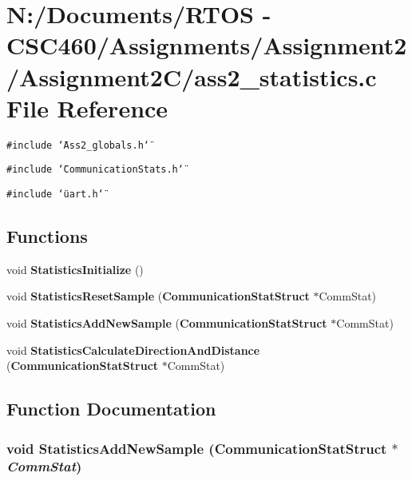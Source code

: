 \section{N:/Documents/RTOS - CSC460/Assignments/Assignment2/Assignment2C/ass2\_\-statistics.c File Reference}
\label{ass2__statistics_8c}
{\tt \#include \char`\"{}Ass2\_\-globals.h\char`\"{}}\par
{\tt \#include \char`\"{}Communication\-Stats.h\char`\"{}}\par
{\tt \#include \char`\"{}uart.h\char`\"{}}\par
\subsection*{Functions}
\begin{CompactItemize}
\item 
void {\bf Statistics\-Initialize} ()
\item 
void {\bf Statistics\-Reset\-Sample} ({\bf Communication\-Stat\-Struct} $\ast$Comm\-Stat)
\item 
void {\bf Statistics\-Add\-New\-Sample} ({\bf Communication\-Stat\-Struct} $\ast$Comm\-Stat)
\item 
void {\bf Statistics\-Calculate\-Direction\-And\-Distance} ({\bf Communication\-Stat\-Struct} $\ast$Comm\-Stat)
\end{CompactItemize}


\subsection{Function Documentation}
\subsubsection{\setlength{\rightskip}{0pt plus 5cm}void Statistics\-Add\-New\-Sample ({\bf Communication\-Stat\-Struct} $\ast$ {\em Comm\-Stat})}\label{ass2__statistics_8c_d0c0a6dacbe926df8eaa23f8d7ab2b76}


